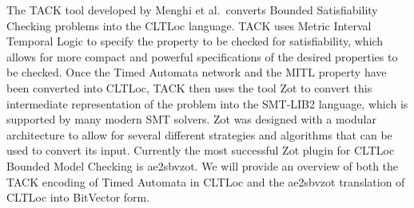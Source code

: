 \documentclass[a4paper,12pt]{article}
\newcommand{\aez}{ae2sbvzot}
\begin{document}
The TACK\cite{tack20} tool developed by Menghi et al.\ converts Bounded
Satisfiability Checking problems into the CLTLoc language. TACK uses Metric
Interval Temporal Logic to specify the property to be checked for satisfiability,
which allows for more compact and powerful specifications of the desired
properties to be checked. Once the Timed Automata network and the MITL property
have been converted into CLTLoc, TACK then uses the tool Zot to convert this
intermediate representation of the problem into the SMT-LIB2 language, which is
supported by many modern SMT solvers. Zot was designed with a modular
architecture to allow for several different strategies and algorithms that can
be used to convert its input. Currently the most successful Zot plugin for
CLTLoc Bounded Model Checking is \aez. We will provide an overview of both
the TACK encoding of Timed Automata in CLTLoc and the ae2sbvzot translation of
CLTLoc into BitVector form.
\end{document}
